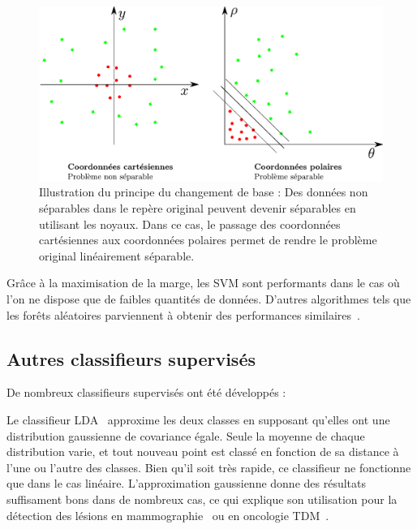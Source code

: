 \begin{figure}[h]
	\begin{center}
	\includegraphics[width=15cm]{images/kernelTrick}
	\end{center}
	\caption[Changement de base pour les SVM]{Illustration du principe du changement de base : Des données non séparables dans le repère original peuvent devenir séparables en utilisant les noyaux. Dans ce cas, le passage des coordonnées cartésiennes aux coordonnées polaires permet de rendre le problème original linéairement séparable.}
	\label{fig:kernelTrick}
\end{figure}


Grâce à la maximisation de la marge, les SVM sont performants dans le cas où l'on ne dispose que de faibles quantités de données. D'autres algorithmes tels que les forêts aléatoires parviennent à obtenir des performances similaires~\cite{statnikov2008comprehensive}.

\subsection{Autres classifieurs supervisés}

De nombreux classifieurs supervisés ont été développés :

\label{lab:LDA}
Le classifieur LDA~\cite{fisher1936use} approxime les deux classes en supposant qu'elles ont une distribution gaussienne de covariance égale. Seule la moyenne de chaque distribution varie, et tout nouveau point est classé en fonction de sa distance à l'une ou l'autre des classes. Bien qu'il soit très rapide, ce classifieur ne fonctionne que dans le cas linéaire. L'approximation gaussienne donne des résultats suffisament bons dans de nombreux cas, ce qui explique son utilisation pour la détection des lésions en mammographie~\cite{baydush2007incorporation} ou en oncologie TDM~\cite{gurcan2002lung}.


